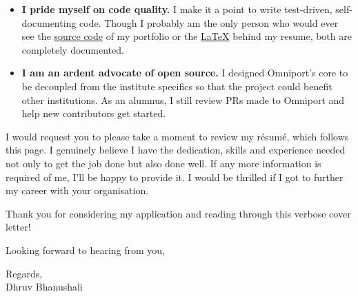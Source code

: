 \begin{itemize}[nosep, parsep=1mm, leftmargin=*]
  \item \textbf{I pride myself on code quality.} I make it a point to write
  test-driven, self-documenting code. Though I probably am the only person who
  would ever see the \href{https://github.com/dhruvkb/portfolio/}{source code}
  of my portfolio or the
  \href{https://github.com/dhruvkb/resume/}{\selectfont\LaTeX}
  behind my resume, both are completely documented.

  \item \textbf{I am an ardent advocate of open source.} I designed Omniport's
  core to be decoupled from the institute specifics so that the project could
  benefit other institutions. As an alumnus, I still review PRs made to Omniport
  and help new contributors get started.
\end{itemize}

I would request you to please take a moment to review my résumé, which follows
this page. I genuinely believe I have the dedication, skills and experience
needed not only to get the job done but also done well. If any more information
is required of me, I'll be happy to provide it. I would be thrilled if I got to
further my career with your organisation.

Thank you for considering my application and reading through this verbose cover
letter!

Looking forward to hearing from you,

Regards,\\
Dhruv Bhanushali
\setlength{\parskip}{0cm} %

\pagebreak